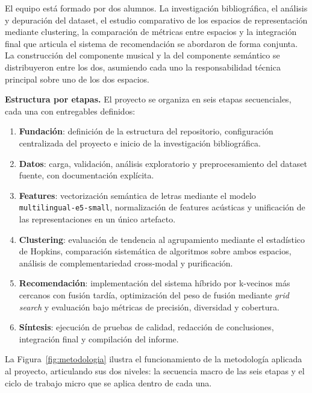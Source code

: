 El equipo está formado por dos alumnos. La investigación bibliográfica, el análisis y depuración del dataset, el estudio comparativo de los espacios de representación mediante clustering, la comparación de métricas entre espacios y la integración final que articula el sistema de recomendación se abordaron de forma conjunta. La construcción del componente musical y la del componente semántico se distribuyeron entre los dos, asumiendo cada uno la responsabilidad técnica principal sobre uno de los dos espacios.

\textbf{Estructura por etapas.} El proyecto se organiza en seis etapas secuenciales, cada una con entregables definidos:

\begin{enumerate}
    \item \textbf{Fundación}: definición de la estructura del repositorio, configuración centralizada del proyecto e inicio de la investigación bibliográfica.
    \item \textbf{Datos}: carga, validación, análisis exploratorio y preprocesamiento del dataset fuente, con documentación explícita.
    \item \textbf{Features}: vectorización semántica de letras mediante el modelo \texttt{multilingual-}\allowbreak\texttt{e5-}\allowbreak\texttt{small}, normalización de features acústicas y unificación de las representaciones en un único artefacto.
    \item \textbf{Clustering}: evaluación de tendencia al agrupamiento mediante el estadístico de Hopkins, comparación sistemática de algoritmos sobre ambos espacios, análisis de complementariedad cross-modal y purificación.
    \item \textbf{Recomendación}: implementación del sistema híbrido por k-vecinos más cercanos con fusión tardía, optimización del peso de fusión mediante \textit{grid search} y evaluación bajo métricas de precisión, diversidad y cobertura.
    \item \textbf{Síntesis}: ejecución de pruebas de calidad, redacción de conclusiones, integración final y compilación del informe.
\end{enumerate}

La Figura~\ref{fig:metodologia} ilustra el funcionamiento de la metodología aplicada al proyecto, articulando sus dos niveles: la secuencia macro de las seis etapas y el ciclo de trabajo micro que se aplica dentro de cada una.

